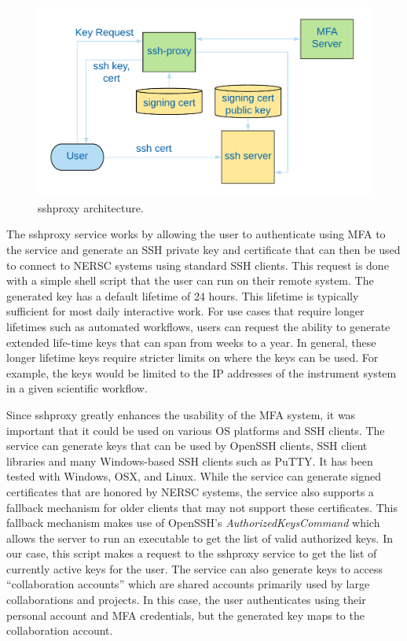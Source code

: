 \documentclass[sigconf,review]{acmart}
\begin{document}
\begin{figure}[h!]
  \centering
  \includegraphics[width=\columnwidth]{sshproxy.png}
  \caption{sshproxy architecture.}
  \label{sshproxy-diagram}
\end{figure}

The sshproxy service works by allowing the user to authenticate using MFA to the
service and generate an SSH private key and certificate \cite{habets2011} that
can then be used to connect to NERSC systems using standard SSH clients.  This
request is done with a simple shell script that the user can run on their remote
system.  The generated key has a default lifetime of 24 hours.  This lifetime is
typically sufficient for most daily interactive work.  For use cases that
require longer lifetimes such as automated workflows, users can request the
ability to generate extended life-time keys that can span from weeks to a year.
In general, these longer lifetime keys require stricter limits on where the keys
can be used.  For example, the keys would be limited to the IP addresses of the
instrument system in a given scientific workflow.

Since sshproxy greatly enhances the usability of the MFA system, it was
important that it could be used on various OS platforms and SSH clients.  The
service can generate keys that can be used by OpenSSH clients, SSH client
libraries and many Windows-based SSH clients such as PuTTY.  It has been tested
with Windows, OSX, and Linux.  While the service can generate signed
certificates that are honored by NERSC systems, the service also supports a
fallback mechanism for older clients that may not support these certificates.
This fallback mechanism makes use of OpenSSH's \textit{AuthorizedKeysCommand}
which allows the server to run an executable to get the list of valid authorized
keys.  In our case, this script makes a request to the sshproxy service to get
the list of currently active keys for the user. The service can also generate
keys to access ``collaboration accounts'' which are shared accounts primarily
used by large collaborations and projects. In this case, the user authenticates
using their personal account and MFA credentials, but the generated key maps to
the collaboration account.
\end{document}
